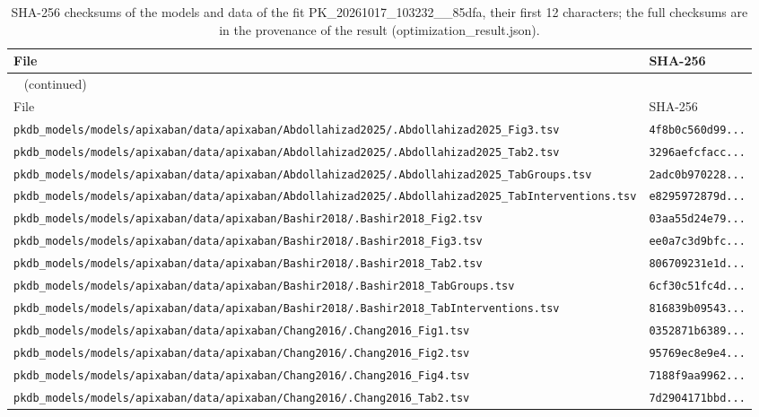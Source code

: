 \begin{longtable}{ll}
\caption{SHA-256 checksums of the models and data of the fit PK\_20261017\_103232\_\_85dfa, their first 12 characters; the full checksums are in the provenance of the result (optimization\_result.json).}\label{tab:checksums:PK_20261017_103232__85dfa} \\
\toprule
File & SHA-256 \\
\midrule
\endfirsthead
\multicolumn{2}{l}{\small\tablename~\thetable{} (continued)} \\
\toprule
File & SHA-256 \\
\midrule
\endhead
\bottomrule
\endlastfoot
\texttt{pkdb\_models/models/apixaban/data/apixaban/Abdollahizad2025/.Abdollahizad2025\_Fig3.tsv} & \texttt{4f8b0c560d99...} \\
\texttt{pkdb\_models/models/apixaban/data/apixaban/Abdollahizad2025/.Abdollahizad2025\_Tab2.tsv} & \texttt{3296aefcfacc...} \\
\texttt{pkdb\_models/models/apixaban/data/apixaban/Abdollahizad2025/.Abdollahizad2025\_TabGroups.tsv} & \texttt{2adc0b970228...} \\
\texttt{pkdb\_models/models/apixaban/data/apixaban/Abdollahizad2025/.Abdollahizad2025\_TabInterventions.tsv} & \texttt{e8295972879d...} \\
\texttt{pkdb\_models/models/apixaban/data/apixaban/Bashir2018/.Bashir2018\_Fig2.tsv} & \texttt{03aa55d24e79...} \\
\texttt{pkdb\_models/models/apixaban/data/apixaban/Bashir2018/.Bashir2018\_Fig3.tsv} & \texttt{ee0a7c3d9bfc...} \\
\texttt{pkdb\_models/models/apixaban/data/apixaban/Bashir2018/.Bashir2018\_Tab2.tsv} & \texttt{806709231e1d...} \\
\texttt{pkdb\_models/models/apixaban/data/apixaban/Bashir2018/.Bashir2018\_TabGroups.tsv} & \texttt{6cf30c51fc4d...} \\
\texttt{pkdb\_models/models/apixaban/data/apixaban/Bashir2018/.Bashir2018\_TabInterventions.tsv} & \texttt{816839b09543...} \\
\texttt{pkdb\_models/models/apixaban/data/apixaban/Chang2016/.Chang2016\_Fig1.tsv} & \texttt{0352871b6389...} \\
\texttt{pkdb\_models/models/apixaban/data/apixaban/Chang2016/.Chang2016\_Fig2.tsv} & \texttt{95769ec8e9e4...} \\
\texttt{pkdb\_models/models/apixaban/data/apixaban/Chang2016/.Chang2016\_Fig4.tsv} & \texttt{7188f9aa9962...} \\
\texttt{pkdb\_models/models/apixaban/data/apixaban/Chang2016/.Chang2016\_Tab2.tsv} & \texttt{7d2904171bbd...} \\

\end{longtable}
